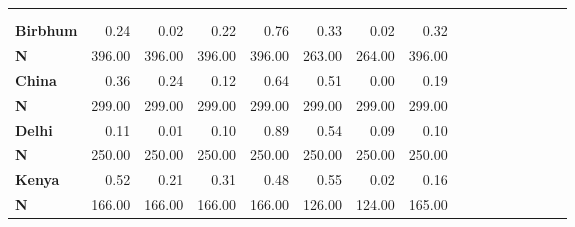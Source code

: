 \begin{tabular}{@{\extracolsep{5pt}}lrrrrrrrrrrrrrrr}
\toprule
&  &  &  &  &  &  &  \\
{\bf } &  &  &  &  &  &  &  \\
\hline
{\bf Birbhum} & 0.24\phantom{***} & 0.02\phantom{***} & 0.22\phantom{***} & 0.76\phantom{***} & 0.33\phantom{***} & 0.02\phantom{***} & 0.32\phantom{***} \\
{\bf N} & 396.00\phantom{***} & 396.00\phantom{***} & 396.00\phantom{***} & 396.00\phantom{***} & 263.00\phantom{***} & 264.00\phantom{***} & 396.00\phantom{***} \\
{\bf China} & 0.36\phantom{***} & 0.24\phantom{***} & 0.12\phantom{***} & 0.64\phantom{***} & 0.51\phantom{***} & 0.00\phantom{***} & 0.19\phantom{***} \\
{\bf N} & 299.00\phantom{***} & 299.00\phantom{***} & 299.00\phantom{***} & 299.00\phantom{***} & 299.00\phantom{***} & 299.00\phantom{***} & 299.00\phantom{***} \\
{\bf Delhi} & 0.11\phantom{***} & 0.01\phantom{***} & 0.10\phantom{***} & 0.89\phantom{***} & 0.54\phantom{***} & 0.09\phantom{***} & 0.10\phantom{***} \\
{\bf N} & 250.00\phantom{***} & 250.00\phantom{***} & 250.00\phantom{***} & 250.00\phantom{***} & 250.00\phantom{***} & 250.00\phantom{***} & 250.00\phantom{***} \\
{\bf Kenya} & 0.52\phantom{***} & 0.21\phantom{***} & 0.31\phantom{***} & 0.48\phantom{***} & 0.55\phantom{***} & 0.02\phantom{***} & 0.16\phantom{***} \\
{\bf N} & 166.00\phantom{***} & 166.00\phantom{***} & 166.00\phantom{***} & 166.00\phantom{***} & 126.00\phantom{***} & 124.00\phantom{***} & 165.00\phantom{***} \\

\end{tabular}
